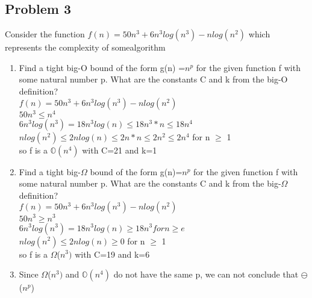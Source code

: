 \documentclass[12pt,letterpaper]{article}
\begin{document}
\begin{itemize}
      \section*{Problem 3}
      Consider the function \(f(n) = 50n^3+6n^3log(n^3)-nlog(n^2)\) which represents the complexity of somealgorithm
      \begin{enumerate}
            \item Find a tight big-O bound of the form g(n) =\(n^p\) for the given function f with some natural number p.  What are the constants C and k from the big-O definition?\\
            \(f(n) = 50n^3+6n^3log(n^3)-nlog(n^2)\)\\
            \(50n^3 \leq n^4\)\\
            \(6n^3log(n^3)=18n^3log(n)\leq 18n^3*n \leq 18n^4\)\\
            \(nlog(n^2)\leq 2nlog(n) \leq 2n*n \leq 2n^2 \leq 2n^4\) for n \(\geq\) 1\\ 
            so f is a \(\mathbb{O}(n^4)\) with C=21 and k=1
            \item Find a tight big-\(\Omega\) bound of the form g(n)=\(n^p\) for the given function f with some natural number p.  What are the constants C and k from the big-\(\Omega\) definition?\\
            \(f(n) = 50n^3+6n^3log(n^3)-nlog(n^2)\)\\
            \(50n^3 \geq n^3\)\\
            \(6n^3log(n^3)=18n^3log(n)\geq 18n^3 for n \geq e\)\\
            \(nlog(n^2)\leq 2nlog(n) \geq 0\) for n \(\geq\) 1\\
            so f is a \(\Omega\)(\(n^3)\) with C=19 and k=6
            \item  Since \(\Omega\)(\(n^3)\) and \(\mathbb{O}(n^4)\) do not have the same 
            p, we can not conclude that \(\ominus\)(\(n^p\))
      \end{enumerate}

\end{itemize}
\end{document}

